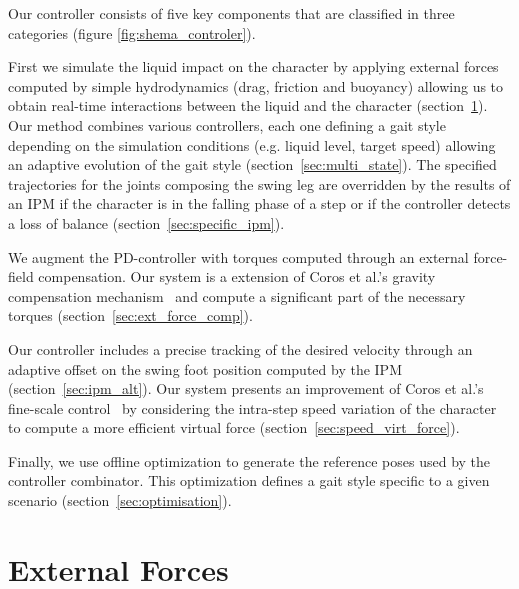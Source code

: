 \documentclass[conference]{acmsiggraph}
\begin{document}
Our controller consists of five key components that are classified in three categories (figure \ref{fig:shema_controler}).

First we simulate the liquid impact on the character by applying external forces computed by simple hydrodynamics (drag, friction and buoyancy) allowing us to obtain real-time interactions between the liquid and the character (section~\ref{sec:ext_forces}). Our method combines various controllers, each one defining a gait style depending on the simulation conditions (e.g. liquid level, target speed) allowing an adaptive evolution of the gait style (section~\ref{sec:multi_state}). The specified trajectories for the joints composing the swing leg are overridden by the results of an IPM if the character is in the falling phase of a step or if the controller detects a loss of balance (section~\ref{sec:specific_ipm}).

We augment the PD-controller with torques computed through an external force-field compensation. Our system is a extension of Coros et al.'s gravity compensation mechanism~\cite{coros2010generalized} and compute a significant part of the necessary torques (section~\ref{sec:ext_force_comp}).

Our controller includes a precise tracking of the desired velocity through an adaptive offset on the swing foot position computed by the IPM (section~\ref{sec:ipm_alt}). Our system presents an improvement of Coros et al.'s fine-scale control~\cite{coros2010generalized} by considering the intra-step speed variation of the character to compute a more efficient virtual force (section~\ref{sec:speed_virt_force}).

Finally, we use offline optimization to generate the reference poses used by the controller combinator. This optimization defines a gait style specific to a given scenario (section~\ref{sec:optimisation}).

\section{External Forces}
\label{sec:ext_forces}
\end{document}
